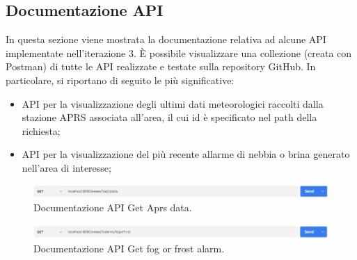 \subsection{Documentazione API}

In questa sezione viene mostrata la documentazione relativa ad alcune API implementate nell'iterazione 3. \`E possibile visualizzare una collezione (creata con Postman) di tutte le API realizzate e testate sulla repository GitHub. In particolare, si riportano di seguito le più significative:
\begin{itemize}
	\item API per la visualizzazione degli ultimi dati meteorologici raccolti dalla stazione APRS associata all'area, il cui id è specificato nel path della richiesta;
	\item API per la visualizzazione del più recente allarme di nebbia o brina generato nell'area di interesse;
\end{itemize}

\begin{figure}[h!]
	\centering
	\includegraphics[width=1\linewidth]{./Iterazione 3/ImageFiles/GetAprsDataRequest}
	
	\caption{Documentazione API Get Aprs data.}
	\label{fig:GetAprsDataAPI}
\end{figure}

\begin{figure}[h!]
	\centering
	\includegraphics[width=1\linewidth]{./Iterazione 3/ImageFiles/GetFrostOrFogAlarmRequest}
	
	\caption{Documentazione API Get fog or frost alarm.}
	\label{fig:GetFrostOrFogAlarm}
\end{figure}
